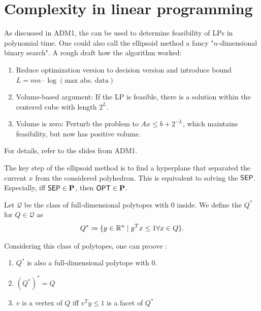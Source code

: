 \section{Complexity in linear programming}
\begin{recall}
    As discussed in ADM1, the  can be used to determine feasibility of LPs in polynomial time.
    One could also call the ellipsoid method a fancy "$n$-dimensional binary search".
    A rough draft how the algorithm worked:
    \begin{enumerate}
        \item Reduce optimization version to decision version and introduce bound $L = mn \cdot \log(\text{max abs. data})$
        \item Volume-based argument: If the LP is feasible, there is a solution within the centered cube with length $2^L$.
        \item Volume is zero: Perturb the problem to $Ax \leq b + 2^{-L}$, which maintains feasibility, but now has positive volume.
    \end{enumerate}
    For details, refer to the slides from ADM1.
\end{recall}
\begin{remark}
    The key step of the ellipsoid method is to find a hyperplane that separated the current $x$ from the considered polyhedron.
    This is equivalent to solving the  $\mathsf{SEP}$.
    Especially, iff $\mathsf{SEP} \in \mathbf{P}$, then $\mathsf{OPT} \in \mathbf{P}$.
\end{remark}
\begin{definition}
    Let $\mathcal{Q}$ be the class of full-dimensional polytopes with $0$ inside.
    We define the  $Q^*$ for $Q \in \mathcal{Q}$ as
    \begin{align*}
        Q^* \coloneqq \{ y \in \mathbb{R}^n \mid y^Tx \leq 1 \forall x \in Q \}.
    \end{align*}
\end{definition}
\begin{theorem}
    Considering this class of polytopes, one can proove \cite[Ch.~4,~Thm.~4.22]{comb-optimization-korte}:
    \begin{enumerate}
        \item $Q^*$ is also a full-dimensional polytope with $0$.
        \item $(Q^*)^* = Q$
        \item $v$ is a vertex of $Q$ iff $v^Ty \leq 1$ is a facet of $Q^*$
    \end{enumerate}
\end{theorem}
